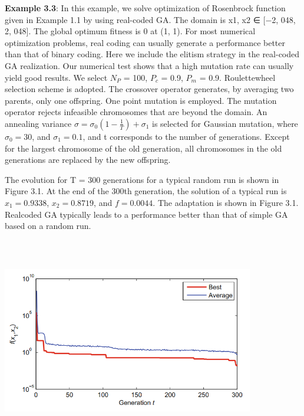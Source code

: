 \documentclass[14pt]{article}
\numberwithin{equation}{subsection}
\begin{document}
		\noindent \textbf{Example 3.3}:  In this example, we solve optimization of Rosenbrock function given in 
		Example 1.1 by using real-coded GA. The domain is x1, x2 ∈ [−2, 048, 2, 048]. The global optimum fitness is 
		0 at (1, 1).
		For most numerical optimization problems, real coding can usually generate a performance better than that of
		binary coding. Here we include the elitism strategy in the real-coded GA realization. Our numerical test shows
		that a high mutation rate can usually yield good results. We select $N_P$ = 100, $P_c$ = 0.9, $P_m$ = 0.9.
		Roulettewheel selection scheme is adopted. The crossover operator generates, by averaging two parents, only one
		offspring. One point mutation is employed. The mutation operator rejects infeasible chromosomes that are beyond
		the domain. An annealing variance $\sigma = \sigma_0(1 − \frac{1}{T} ) + \sigma_1$ is selected for Gaussian
		mutation, where $\sigma_0 = 30$, and $\sigma_1 = 0.1$, and t corresponds to the number of generations. Except for
		the largest chromosome of the old generation, all chromosomes in the old generations are replaced by the new
		offspring. \par
		The evolution for T = 300 generations for a typical random run is shown in Figure 3.1. At the end of the 300th
		generation, the solution of a typical run is $x_1 = 0.9338$, $x_2 = 0.8719$, and $f = 0.0044$. The adaptation
		is shown in Figure 3.1. Realcoded GA typically leads to a performance better than that of simple GA based on
		a random run.
		
		\begin{center}
				\includegraphics[width=11cm, height=9cm]{figure_3-1.PNG}
		\end{center}
		
\end{document}
